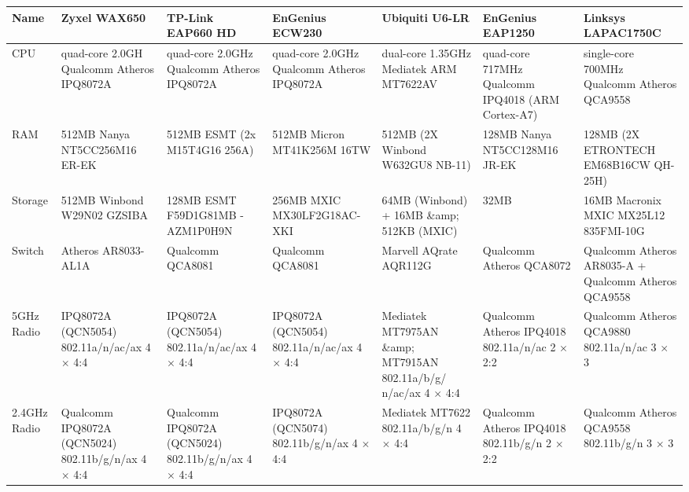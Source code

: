 \documentclass[a4paper,12pt]{report}
\begin{document}
\begin{table}[!ht]
  \centering
  \singlespace
  \scriptsize
  \begin{tabular}{|p{}*{6}{|p{0.11\textwidth}}|} %
      \hline
      Name &
      Zyxel WAX650 &
      TP-Link EAP660 HD &
      EnGenius ECW230 &
      Ubiquiti U6-LR &
      EnGenius EAP1250 &
      Linksys LAPAC1750C \\

      \hline
      CPU &
      quad-core 2.0GH Qualcomm Atheros IPQ8072A &
      quad-core 2.0GHz Qualcomm Atheros IPQ8072A &
      quad-core 2.0GHz Qualcomm Atheros IPQ8072A &
      dual-core 1.35GHz Mediatek ARM MT7622AV  &
      quad-core 717MHz Qualcomm IPQ4018 (ARM Cortex-A7) &
      single-core 700MHz Qualcomm Atheros QCA9558 \\

      \hline
      RAM &
      512MB Nanya NT5CC256M16 \allowbreak ER-EK &
      512MB ESMT (2x M15T4G16 \allowbreak 256A) &
      512MB Micron MT41K256M \allowbreak 16TW &
      512MB (2X Winbond W632GU8 \allowbreak NB-11) &
      128MB Nanya NT5CC128M16 \allowbreak JR-EK &
      128MB (2X ETRONTECH EM68B16CW \allowbreak QH-25H) \\

      \hline
      Storage &
      512MB Winbond W29N02 \allowbreak GZSIBA &
      128MB ESMT F59D1G81MB \allowbreak -AZM1P0H9N &
      256MB MXIC MX30LF2G18AC-XKI &
      64MB (Winbond) + 16MB \&amp; 512KB (MXIC) &
      32MB &
      16MB Macronix MXIC MX25L12 \allowbreak 835FMI-10G \\

      \hline
      Switch &
      Atheros AR8033-AL1A &
      Qualcomm QCA8081 &
      Qualcomm QCA8081 &
      Marvell AQrate AQR112G &
      Qualcomm Atheros QCA8072 & 
      Qualcomm Atheros AR8035-A + Qualcomm Atheros QCA9558 \\

      \hline
      5GHz Radio & 
      IPQ8072A (QCN5054) 802.11a/n/ac/ax 4 $ \times $ 4:4 &
      IPQ8072A (QCN5054) 802.11a/n/ac/ax 4 $ \times $ 4:4 &
      IPQ8072A (QCN5054) 802.11a/n/ac/ax 4 $ \times $ 4:4 &
      Mediatek MT7975AN \&amp; MT7915AN 802.11a/b/g/ \allowbreak n/ac/ax 4 $ \times $ 4:4 &
      Qualcomm Atheros IPQ4018 802.11a/n/ac 2 $ \times $ 2:2 &
      Qualcomm Atheros QCA9880 802.11a/n/ac 3 $ \times $ 3 \\

      \hline
      2.4GHz Radio &
      Qualcomm IPQ8072A (QCN5024) 802.11b/g/n/ax 4 $ \times $ 4:4 &
      Qualcomm IPQ8072A (QCN5024) 802.11b/g/n/ax 4 $ \times $ 4:4 &
      IPQ8072A (QCN5074) 802.11b/g/n/ax 4 $ \times $ 4:4 &
      Mediatek MT7622 802.11a/b/g/n 4 $ \times $ 4:4 &
      Qualcomm Atheros IPQ4018 802.11b/g/n 2 $ \times $ 2:2 &
      Qualcomm Atheros QCA9558 802.11b/g/n 3 $ \times $ 3 \\


\end{tabular}
\end{table}
\end{document}
